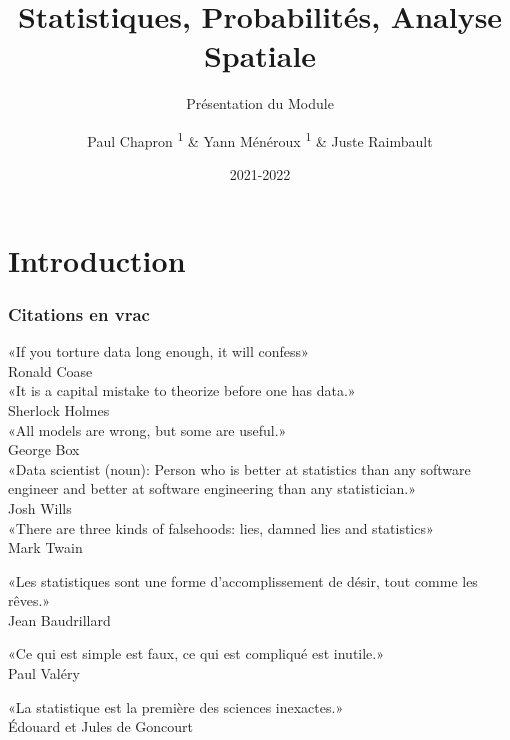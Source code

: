 \documentclass{beamer}
\title{Statistiques, Probabilités, Analyse Spatiale}
\subtitle{Présentation du Module}
\date{2021-2022}
\author{Paul Chapron \textsuperscript{1} \& Yann Ménéroux \textsuperscript{1} \& Juste Raimbault }
\institute{ \textsuperscript{1}IGN-ENSG-UGE}
\begin{document}
\maketitle	

\section{Introduction} 



\begin{frame}
\frametitle{Citations en vrac}

\begin{tiny}


\hfill «If you torture data long enough, it will confess» \\
\hfill Ronald Coase\\
\vfill
\hfill «It is a capital mistake to theorize before one has data.»\\
\hfill Sherlock Holmes\\
\vfill
\hfill «All models are wrong, but some are useful.»\\
\hfill  George Box\\
\vfill
\hfill «Data scientist (noun): Person who is better at statistics than any software engineer and better at software engineering than any statistician.»\\
\hfill Josh Wills\\
\vfill
\hfill «There are three kinds of falsehoods: lies, damned lies and statistics» \\
\hfill Mark Twain\\ 
\vfill

\hfill «Les statistiques sont une forme d'accomplissement de désir, tout comme les rêves.» \\
\hfill Jean Baudrillard\\
\vfill



\hfill «Ce qui est simple est faux, ce qui est compliqué est inutile.» \\
\hfill Paul Valéry\\
\vfill


\hfill «La statistique est la première des sciences inexactes.»\\
\hfill  Édouard et Jules de Goncourt



\end{tiny}


\end{frame}
\end{document}
